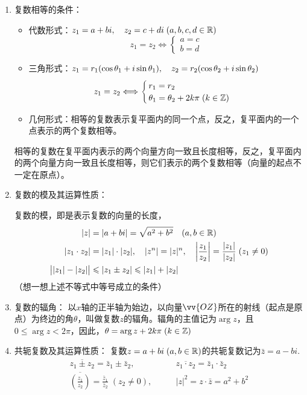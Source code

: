 \begin{enumerate}
复数的三种表示形式之间是可以互化的，除了实数零以外，它们彼此之间都是一一对应的，即
\begin{center}
\end{center}

由复数的三种表示形式可知：确定一个复数需要两个实数，即确定一个复数要且仅要两个独立的条件。
\item 复数相等的条件：
\begin{itemize}
    \item 代数形式：$z_1=a+bi,\quad z_2=c+di\; (a,b,c,d\in\mathbb{R})$
\[z_1=z_2\Longleftrightarrow \begin{cases}
    a=c\\ b=d
\end{cases}\]
\item 三角形式：$z_1=r_1(\cos\theta_1+i\sin\theta_1),\quad z_2=r_2(\cos\theta_2+i\sin\theta_2)$
\[z_1=z_2\Longleftrightarrow \begin{cases}
    r_1=r_2\\ \theta_1=\theta_2+2k\pi\; (k\in\mathbb{Z})
\end{cases}\]
\item 几何形式：相等的复数表示复平面内的同一个点，反之，复平面内的一个点表示的两个复数相等。
\end{itemize}

相等的复数在复平面内表示的两个向量方向一致且长度相等，反之，复平面内的两个向量方向一致且长度相等，则它们表示的两个复数相等（向量的起点不一定在原点）。

\item 复数的模及其运算性质：

复数的模，即是表示复数的向量的长度，
\[\begin{split}
   |z|&=|a+bi| =\sqrt{a^2+b^2}\quad (a,b\in\mathbb{R})\\
    |z_1\cdot z_2|& =|z_1|\cdot |z_2|,\quad |z^n|=|z|^n,\quad \left|\dfrac{z_1}{z_2}\right|=\dfrac{|z_1|}{|z_2|}\; (z_1\ne 0)\\
   \big| |z_1|-|z_2| \big|& \leqslant |z_1\pm z_2|\leqslant |z_1|+|z_2|
\end{split}\]
（想一想上述不等式中等号成立的条件）
\item 复数的辐角：
以$x$轴的正半轴为始边，以向量$\vv{OZ}$所在的射线（起点是原点）为终边的角$\theta$，叫做复数$z$的辐角。辐角的主值记为$\arg z$，且$0\le \arg z<2\pi$，因此，$\theta=\arg z+2k\pi\; (k\in\mathbb{Z})$
\item 共轭复数及其运算性质：
复数$z=a+bi\; (a,b\in\mathbb{R})$的共轭复数记为$\bar z=a-bi$.
\[\begin{split}
    \overline{z_1\pm z_2}=\bar z_1\pm\bar z_2,&\qquad \overline{z_1\cdot z_2}=\bar z_1\cdot \bar z_2\\
    \overline{\left(\frac{z_1}{z_2}\right)}=\frac{\bar z_1}{\bar z_2}\; (z_2\ne 0),&\qquad |z|^2=z\cdot \bar z=a^2+b^2
\end{split}\]
\end{enumerate}

